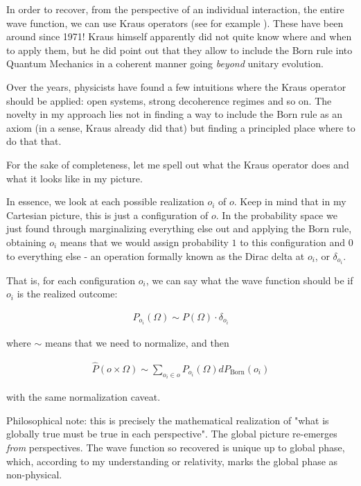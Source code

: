 \documentclass{article}
\begin{document}
In order to recover, from the perspective of an individual interaction, the entire wave function, we can use Kraus operators (see for example \cite{griffiths_qitd412}). These have been around since 1971! Kraus himself apparently did not quite know where and when to apply them, but he did point out that they allow to include the Born rule into Quantum Mechanics in a coherent manner going \textit{beyond} unitary evolution.

Over the years, physicists have found a few intuitions where the Kraus operator should be applied: open systems, strong decoherence regimes and so on. The novelty in my approach lies not in finding a way to include the Born rule as an axiom (in a sense, Kraus already did that) but finding a principled place where to do that that.

For the sake of completeness, let me spell out what the Kraus operator does and what it looks like in my picture.

In essence, we look at each possible realization $o_i$ of $o$. Keep in mind that in my Cartesian picture, this is just a configuration of $o$. In the probability space we just found through marginalizing everything else out and applying the Born rule, obtaining $o_i$ means that we would assign probability $1$ to this configuration and $0$ to everything else - an operation formally known as the Dirac delta at $o_i$, or $\delta_{o_i}$.

That is, for each configuration $o_i$, we can say what the wave function should be if $o_i$ is the realized outcome:

\begin{align*}
P_{o_i}(\Omega) \sim P(\Omega)\cdot \delta_{o_i}
\end{align*}

where $\sim$ means that we need to normalize, and then

\begin{align*}
\widehat{P}(o \times \Omega) \sim \sum_{o_i\in o} P_{o_i}(\Omega) dP_{\text{Born}}(o_i)
\end{align*}

with the same normalization caveat.

Philosophical note: this is precisely the mathematical realization of "what is globally true must be true in each perspective". The global picture re-emerges \textit{from} perspectives. The wave function so recovered is unique up to global phase, which, according to my understanding or relativity, marks the global phase as non-physical.
\end{document}
